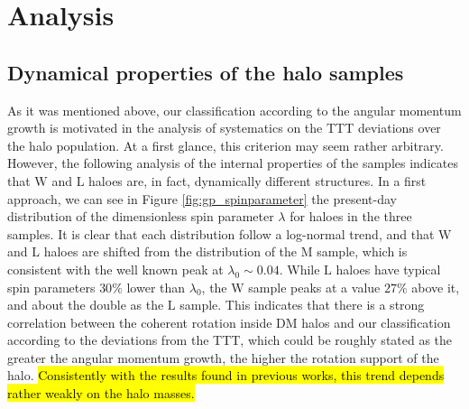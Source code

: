 \documentclass[fleqn,usenatbib]{mnras}
\newcommand{\Wh}{\mathrm{W}}
\newcommand{\Lh}{\mathrm{L}}
\newcommand{\Mh}{\mathrm{M}}
\begin{document}
\section{Analysis}
\label{results}
\subsection{Dynamical properties of the halo samples}

As it was mentioned above, our classification according to the angular momentum growth is motivated in the analysis of systematics on the TTT deviations over the halo population. At a first glance, this criterion may seem rather arbitrary. However, the following analysis of the internal properties of the samples indicates that $\Wh$ and $\Lh$ haloes are, in fact, dynamically different structures. In a first approach, we can see in Figure \ref{fig:gp_spinparameter} the present-day distribution of the dimensionless spin parameter $\lambda$ for haloes in the three samples. It is clear that each distribution follow a log-normal trend, and that $\Wh$ and $\Lh$ haloes are shifted from the distribution of the $\Mh$ sample, which is consistent with the well known peak at $\lambda_{0}\sim 0.04$. While $\Lh$ haloes have typical spin parameters $30\%$ lower than $\lambda_\mathrm{0}$, the $\Wh$ sample peaks at a value $27\%$ above it, and about the double as the $\Lh$ sample. This indicates that there is a strong correlation between the coherent rotation inside DM halos and our classification according to the deviations from the TTT, which could be roughly stated as the greater the angular momentum growth, the higher the rotation support of the halo. \hl{Consistently with the results found in previous works, this trend depends rather weakly on the halo masses.}
\end{document}
